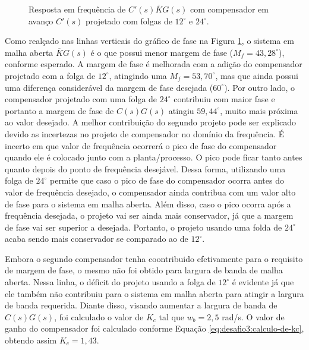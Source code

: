\begin{figure}[!ht]
    \caption{Resposta em frequência de ${C}'(s)\overline{K}G(s)$ com compensador
    em avanço ${C}'(s)$ projetado com folgas de $12^{\circ}$ e $24^{\circ}$.}
    \vspace{-10pt}
    \hspace{-30pt}
    \label{fig:desafio-3:questao-3-4-malha-aberta}
    \begin{minipage}{\linewidth}
        
    \end{minipage}
\end{figure}

Como realçado nas linhas verticais do gráfico de fase na Figura
\ref{fig:desafio-3:questao-3-4-malha-aberta}, o sistema em malha aberta
$\overline{K}G(s)$ é o que possui menor margem de fase ($M_{f} =
43,28^{\circ}$), conforme esperado. A margem de fase é melhorada com a adição do
compensador projetado com a folga de $12^{\circ}$, atingindo uma $M_{f} =
53,70^{\circ}$, mas que ainda possui uma diferença considerável da margem de
fase desejada ($60^{\circ}$). Por outro lado, o compensador projetado com uma
folga de $24^{\circ}$ contribuiu com maior fase e portanto a margem de fase de
$C(s)G(s)$ atingiu $59,44^{\circ}$, muito mais próxima ao valor desejado. A
melhor contribuição do segundo projeto pode ser explicado devido as incertezas
no projeto de compensador no domínio da frequência. É incerto em que valor de
frequência ocorrerá o pico de fase do compensador quando ele é colocado junto
com a planta/processo. O pico pode ficar tanto antes quanto depois do ponto de
frequência desejável. Dessa forma, utilizando uma folga de $24^{\circ}$ permite
que caso o pico de fase do compensador ocorra antes do valor de frequência
desejado, o compensador ainda contribua com um valor alto de fase para o sistema
em malha aberta. Além disso, caso o pico ocorra após a frequência desejada, o
projeto vai ser ainda mais conservador, já que a margem de fase vai ser superior
a desejada. Portanto, o projeto usando uma folda de $24^{\circ}$ acaba sendo
mais conservador se comparado ao de $12^{\circ}$.

Embora o segundo compensador tenha coontribuido efetivamente para o requisito de
margem de fase, o mesmo não foi obtido para largura de banda de malha aberta.
Nessa linha, o déficit do projeto usando a folga de $12^{\circ}$ é evidente já
que ele também não contribuiu para o sistema em malha aberta para atingir a
largura de banda requerida. Diante disso, visando aumentar a largura de banda de
$C(s)G(s)$, foi calculado o valor de $K_{c}$ tal que $w_{b} = 2,5$ rad/s. O
valor de ganho do compensador foi calculado conforme Equação
\ref{eq:desafio3:calculo-de-kc}, obtendo assim $K_c = 1,43$.

